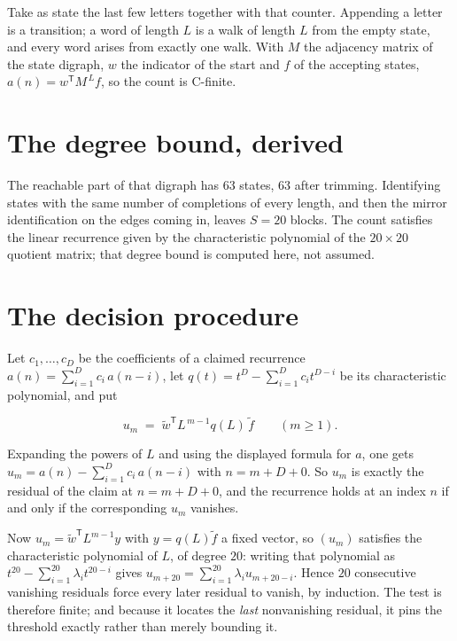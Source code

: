 \documentclass[11pt]{article}
\theoremstyle{definition}
\begin{document}
Take as state the last few letters together with that counter. Appending a letter is a transition; a word of length $L$ is a walk of length $L$ from the empty state, and every word arises from exactly one walk. With $M$ the adjacency matrix of the state digraph, $w$ the indicator of the start and $f$ of the accepting states, $a(n) = w^{\mathsf T}M^{\,L}f$, so the count is C-finite.

\section{The degree bound, derived}

The reachable part of that digraph has $63$ states, $63$ after trimming. Identifying states with the same number of completions of every length, and then the mirror identification on the edges coming in, leaves $S = 20$ blocks. The count satisfies the linear recurrence given by the characteristic polynomial of the $20\times20$ quotient matrix; that degree bound is computed here, not assumed.

\section{The decision procedure}

Let $c_1,\dots,c_D$ be the coefficients of a claimed recurrence $a(n) = \sum_{i=1}^{D} c_i\,a(n-i)$, let $q(t) = t^{D} - \sum_{i=1}^{D} c_i t^{D-i}$ be its characteristic polynomial, and put

\[u_m \;=\; \tilde w^{\mathsf T} L^{\,m-1} q(L)\,\tilde f \qquad (m \ge 1).\]

Expanding the powers of $L$ and using the displayed formula for $a$, one gets $u_m = a(n) - \sum_{i=1}^{D} c_i\,a(n-i)$ with $n = m + D + 0$. So $u_m$ is exactly the residual of the claim at $n = m + D + 0$, and the recurrence holds at an index $n$ if and only if the corresponding $u_m$ vanishes.

Now $u_m = \tilde w^{\mathsf T} L^{m-1} y$ with $y = q(L)\tilde f$ a fixed vector, so $(u_m)$ satisfies the characteristic polynomial of $L$, of degree $20$: writing that polynomial as $t^{20} - \sum_{i=1}^{20} \lambda_i t^{20-i}$ gives $u_{m+20} = \sum_{i=1}^{20} \lambda_i u_{m+20-i}$. Hence $20$ consecutive vanishing residuals force every later residual to vanish, by induction. The test is therefore finite; and because it locates the {\itshape last} nonvanishing residual, it pins the threshold exactly rather than merely bounding it.
\end{document}
